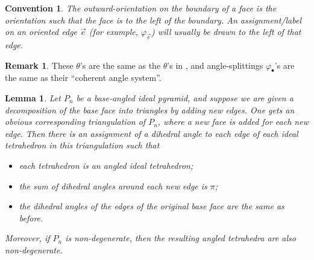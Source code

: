 \documentclass[11pt]{amsart}
\newcommand{\vphi}{\varphi}
\theoremstyle{plain}
\newtheorem{lemma}[theorem]{Lemma}
\newtheorem{convention}[theorem]{Convention}
\theoremstyle{definition}
\newtheorem{remark}[theorem]{Remark}
\begin{document}
\begin{convention}
The outward-orientation on the boundary of a face
is the orientation such that the face is to the left of the boundary.
An assignment/label on an oriented edge $\vec{e}$
(for example, $\vphi_{\vec{e}}$)
will usually be drawn to the left of that edge.
\label{cvn:ornt-edge}
\end{convention}


\begin{remark}
These $\theta$'s are the same as the $\theta$'s in
\cite{BandS},
and angle-splittings $\vphi_\bullet$'s
are the same as their ``coherent angle system''.
\end{remark}



\begin{lemma}
\label{l:pyramid_decomp}
Let $P_n$ be a base-angled ideal pyramid, and suppose we are given a
decomposition of the base face into triangles by adding new edges.  One gets an
obvious corresponding triangulation of $P_n$, where a new face is added for each
new edge. Then there is an assignment of a dihedral angle to each edge of each
ideal tetrahedron in this triangulation such that
\begin{itemize}
\item each tetrahedron is an angled ideal tetrahedron;
\item the sum of dihedral angles around each new edge is $\pi$;
\item the dihedral angles of the edges of the original base face are the same as
	before.
\end{itemize} 
Moreover, if $P_n$ is non-degenerate,
then the resulting angled tetrahedra are also non-degenerate.
\end{lemma}
\end{document}

